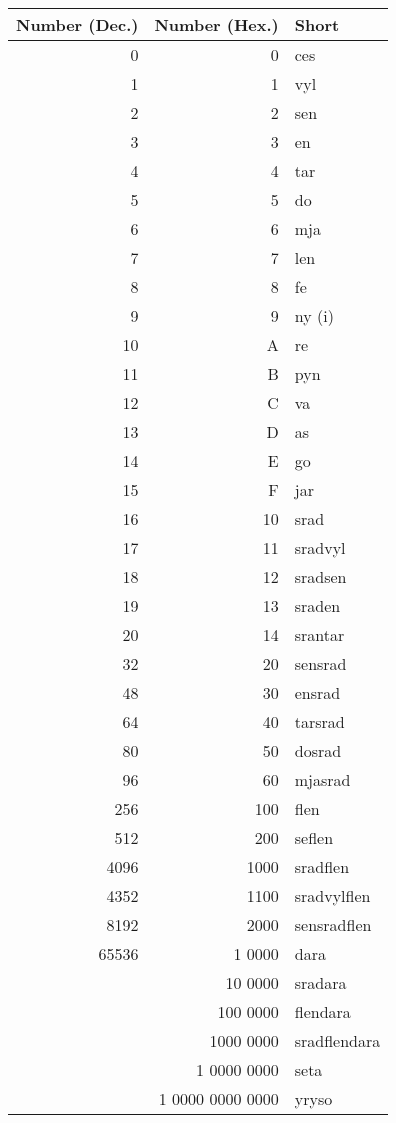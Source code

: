 \documentclass{book}
\begin{document}
\begin{center}
  \begin{longtable}{|r|r|l|}
    \hline
    \textbf{Number (Dec.)} & \textbf{Number (Hex.)} & \textbf{Short} \\ \hline
    \endhead
    0 & 0 & ces \\
    1 & 1 & vyl \\
    2 & 2 & sen \\
    3 & 3 & en \\
    4 & 4 & tar \\
    5 & 5 & do \\
    6 & 6 & mja \\
    7 & 7 & len \\
    8 & 8 & fe \\
    9 & 9 & ny (i) \\
    10 & A & re \\
    11 & B & pyn \\
    12 & C & va \\
    13 & D & as \\
    14 & E & go \\
    15 & F & jar \\
    16 & 10 & srad \\
    17 & 11 & sradvyl \\
    18 & 12 & sradsen \\
    19 & 13 & sraden \\
    20 & 14 & srantar \\
    32 & 20 & sensrad \\
    48 & 30 & ensrad \\
    64 & 40 & tarsrad \\
    80 & 50 & dosrad \\
    96 & 60 & mjasrad \\
    256 & 100 & flen \\
    512 & 200 & seflen \\
    4096 & 1000 & sradflen \\
    4352 & 1100 & sradvylflen \\
    8192 & 2000 & sensradflen \\
    65536 & 1 0000 & dara \\
    & 10 0000 & sradara \\
    & 100 0000 & flendara \\
    & 1000 0000 & sradflendara \\
    & 1 0000 0000 & seta \\
    & 1 0000 0000 0000 & yryso \\

\end{longtable}
\end{center}
\end{document}
